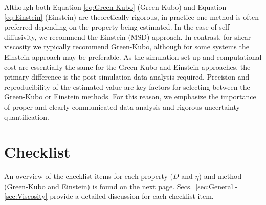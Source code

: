 \documentclass[9pt,bestpractices]{livecoms}
\begin{document}
Although both Equation \ref{eq:Green-Kubo} (Green-Kubo) and Equation \ref{eq:Einstein} (Einstein) are theoretically rigorous, in practice one method is often preferred depending on the property being estimated. In the case of self-diffusivity, we recommend the Einstein (MSD) approach. In contrast, for shear viscosity we typically recommend Green-Kubo, although for some systems the Einstein approach may be preferable. As the simulation set-up and computational cost are essentially the same for the Green-Kubo and Einstein approaches, the primary difference is the post-simulation data analysis required. Precision and reproducibility of the estimated value are key factors for selecting between the Green-Kubo or Einstein methods. For this reason, we emphasize the importance of proper and clearly communicated data analysis and rigorous uncertainty quantification.

\section{Checklist} \label{Checklist}

An overview of the checklist items for each property $(D$ and $\eta)$ and method (Green-Kubo and Einstein) is found on the next page. Secs.\ \ref{sec:General}-\ref{sec:Viscosity} provide a detailed discussion for each checklist item.

\end{document}
